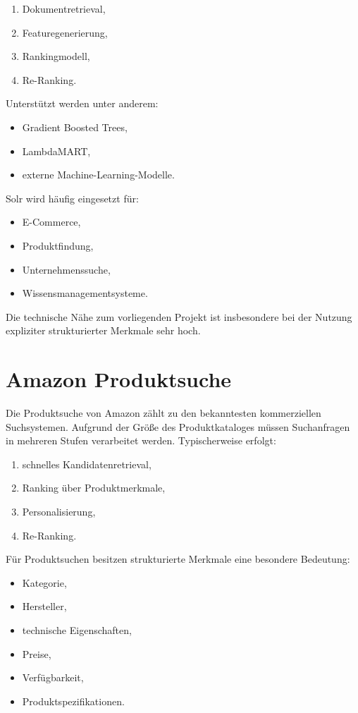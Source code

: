 \begin{enumerate}
  \item Dokumentretrieval,
  \item Featuregenerierung,
  \item Rankingmodell,
  \item Re-Ranking.
\end{enumerate}

Unterstützt werden unter anderem:

\begin{itemize}
  \item Gradient Boosted Trees,
  \item LambdaMART,
  \item externe Machine-Learning-Modelle.
\end{itemize}

Solr wird häufig eingesetzt für:

\begin{itemize}
  \item E-Commerce,
  \item Produktfindung,
  \item Unternehmenssuche,
  \item Wissensmanagementsysteme.
\end{itemize}

Die technische Nähe zum vorliegenden Projekt ist insbesondere bei der Nutzung expliziter strukturierter Merkmale sehr hoch.

\section{Amazon Produktsuche}

Die Produktsuche von Amazon zählt zu den bekanntesten kommerziellen Suchsystemen.
Aufgrund der Größe des Produktkataloges müssen Suchanfragen in mehreren Stufen verarbeitet werden.
Typischerweise erfolgt:

\begin{enumerate}
  \item schnelles Kandidatenretrieval,
  \item Ranking über Produktmerkmale,
  \item Personalisierung,
  \item Re-Ranking.
\end{enumerate}

Für Produktsuchen besitzen strukturierte Merkmale eine besondere Bedeutung:

\begin{itemize}
  \item Kategorie,
  \item Hersteller,
  \item technische Eigenschaften,
  \item Preise,
  \item Verfügbarkeit,
  \item Produktspezifikationen.
\end{itemize}

